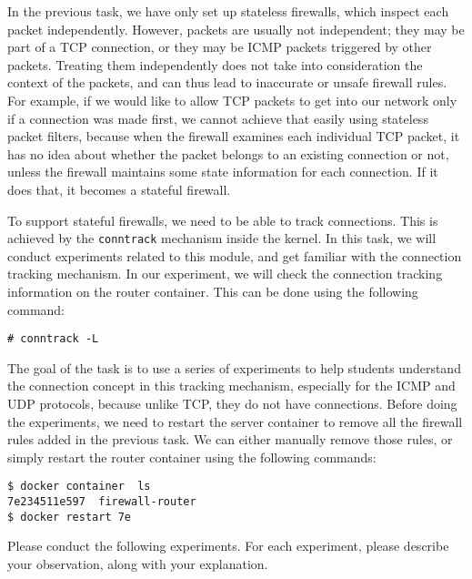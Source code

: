 In the previous task, we have only set up stateless firewalls, which inspect each
packet independently. However, packets
are usually not independent; they may be part of a TCP connection,
or they may be ICMP packets triggered by other packets. Treating them
independently does not take into consideration the context of the
packets, and can thus lead to inaccurate or unsafe firewall rules.
For example, if we would like to allow TCP packets to get into our network
only if a connection was made first, we cannot achieve that easily 
using stateless packet filters, because when the firewall examines each individual TCP packet,
it has no idea about whether the packet belongs to an existing connection
or not, unless the firewall maintains some state information for each connection.
If it does that, it becomes a stateful firewall.


To support stateful firewalls, we need to be able to track connections. 
This is achieved by the \texttt{conntrack} mechanism inside the kernel. 
In this task, we will conduct experiments related to this module, and 
get familiar with the connection tracking mechanism. 
In our experiment, we will check the connection tracking information
on the router container. This can be done using the following command: 

\begin{lstlisting}
# conntrack -L
\end{lstlisting}

The goal of the task is to use a series of experiments to 
help students understand the 
connection concept in this tracking mechanism, especially
for the ICMP and UDP protocols, because unlike TCP,  they 
do not have connections. 
Before doing the experiments, we need to restart the server container to
remove all the firewall rules added in the previous task. We can either 
manually remove those rules, or simply restart the router container 
using the following commands:

\begin{lstlisting}
$ docker container  ls
7e234511e597  firewall-router
$ docker restart 7e
\end{lstlisting}

Please conduct the following experiments. For each experiment, please 
describe your observation, along with your explanation. 

